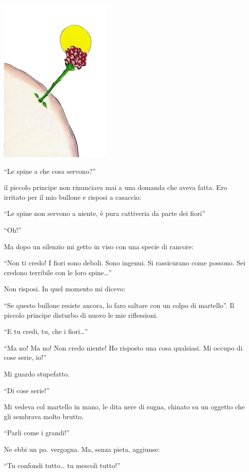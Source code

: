 \documentclass[11pt]{scrbook}
\begin{document}
\begin{center}
\includegraphics{img/7a}

\end{center}

``Le spine a che cosa servono?''

il piccolo principe non rinunciava mai a una domanda che aveva fatta.
Ero irritato per il mio bullone e risposi a casaccio:

``Le spine non servono a niente, è pura cattiveria da parte dei fiori''

``Oh!''

Ma dopo un silenzio mi getto in viso con una specie di rancore:

``Non ti credo! I fiori sono deboli. Sono ingenui. Si rassicurano come
possono. Sei credono terribile con le loro spine\ldots{}''

Non risposi. In quel momento mi dicevo:

``Se questo bullone resiste ancora, lo faro saltare con un colpo di
martello''. Il piccolo principe disturbo di nuovo le mie riflessioni.

``E tu credi, tu, che i fiori\ldots{}''

``Ma no! Ma no! Non credo niente! Ho risposto una cosa qualsiasi. Mi
occupo di cose serie, io!''

Mi guardo stupefatto.

``Di cose serie!''

Mi vedeva col martello in mano, le dita nere di sugna, chinato su un
oggetto che gli sembrava molto brutto.

``Parli come i grandi!''

Ne ebbi un po. vergogna. Ma, senza pieta, aggiunse:

``Tu confondi tutto\ldots{} tu mescoli tutto!''
\end{document}
